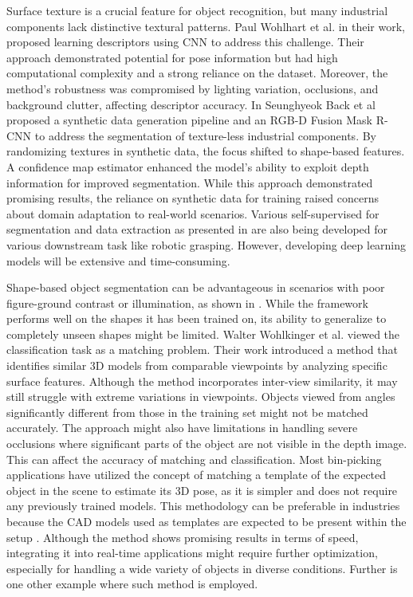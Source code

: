 \documentclass[conference]{IEEEtran}
\begin{document}
Surface texture is a crucial feature for object recognition, but many industrial components lack distinctive textural patterns. Paul Wohlhart et al. in their work\cite{Learning_descriptors}, proposed learning descriptors using CNN to address this challenge. Their approach demonstrated potential for pose information but had high computational complexity and a strong reliance on the dataset. Moreover, the method's robustness was compromised by lighting variation, occlusions, and background clutter, affecting descriptor accuracy. In \cite{Segmenting_Unseen_Industrial_Components} Seunghyeok Back et al proposed a synthetic data generation pipeline and an RGB-D Fusion Mask R-CNN to address the segmentation of texture-less industrial components. By randomizing textures in synthetic data, the focus shifted to shape-based features. A confidence map estimator enhanced the model's ability to exploit depth information for improved segmentation. While this approach demonstrated promising results, the reliance on synthetic data for training raised concerns about domain adaptation to real-world scenarios. Various self-supervised for segmentation and data extraction as presented in \cite{shapematcher} are also being developed for various downstream task like robotic grasping. However, developing deep learning models will be extensive and time-consuming. 

Shape-based object segmentation can be advantageous in scenarios with poor figure-ground contrast or illumination, as shown in \cite{Shape_guided_object_segmentation}. While the framework performs well on the shapes it has been trained on, its ability to generalize to completely unseen shapes might be limited. Walter Wohlkinger et al. viewed the classification task as a matching problem. Their work \cite{Shape_based_depth_image_to_3D} introduced a method that identifies similar 3D models from comparable viewpoints by analyzing specific surface features. Although the method incorporates inter-view similarity, it may still struggle with extreme variations in viewpoints. Objects viewed from angles significantly different from those in the training set might not be matched accurately. The approach might also have limitations in handling severe occlusions where significant parts of the object are not visible in the depth image. This can affect the accuracy of matching and classification. Most bin-picking applications have utilized the concept of matching a template of the expected object in the scene to estimate its 3D pose, as it is simpler and does not require any previously trained models. This methodology can be preferable in industries because the CAD models used as templates are expected to be present within the setup \cite{Fast_Object_Pose}. Although the method shows promising results in terms of speed, integrating it into real-time applications might require further optimization, especially for handling a wide variety of objects in diverse conditions. Further \cite{Mobile_bin_picking_with_an_anthropomorphic_service_robot} is one other example where such method is employed. \\
\end{document}
